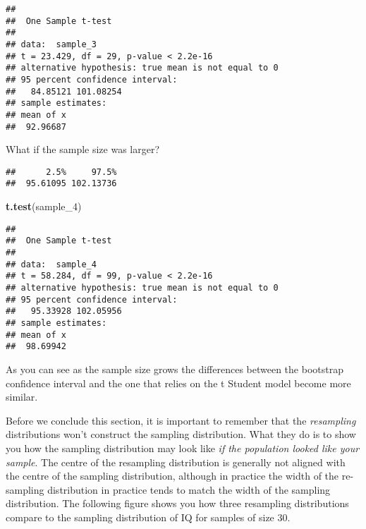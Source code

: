 \documentclass[
]{book}
\newenvironment{Shaded}{\begin{snugshade}}{\end{snugshade}}
\newcommand{\AttributeTok}[1]{\textcolor[rgb]{0.13,0.29,0.53}{#1}}
\newcommand{\DecValTok}[1]{\textcolor[rgb]{0.00,0.00,0.81}{#1}}
\newcommand{\FunctionTok}[1]{\textcolor[rgb]{0.13,0.29,0.53}{\textbf{#1}}}
\newcommand{\NormalTok}[1]{#1}
\newcommand{\OtherTok}[1]{\textcolor[rgb]{0.56,0.35,0.01}{#1}}
\newcommand{\SpecialCharTok}[1]{\textcolor[rgb]{0.81,0.36,0.00}{\textbf{#1}}}
\begin{document}
\begin{verbatim}
## 
##  One Sample t-test
## 
## data:  sample_3
## t = 23.429, df = 29, p-value < 2.2e-16
## alternative hypothesis: true mean is not equal to 0
## 95 percent confidence interval:
##   84.85121 101.08254
## sample estimates:
## mean of x 
##  92.96687
\end{verbatim}

What if the sample size was larger?

\begin{Shaded}
\end{Shaded}

\begin{verbatim}
##      2.5%     97.5% 
##  95.61095 102.13736
\end{verbatim}

\begin{Shaded}
\begin{Highlighting}[]
\FunctionTok{t.test}\NormalTok{(sample\_4)}
\end{Highlighting}
\end{Shaded}

\begin{verbatim}
## 
##  One Sample t-test
## 
## data:  sample_4
## t = 58.284, df = 99, p-value < 2.2e-16
## alternative hypothesis: true mean is not equal to 0
## 95 percent confidence interval:
##   95.33928 102.05956
## sample estimates:
## mean of x 
##  98.69942
\end{verbatim}

As you can see as the sample size grows the differences between the bootstrap confidence interval and the one that relies on the t Student model become more similar.

Before we conclude this section, it is important to remember that the \emph{resampling} distributions won't construct the sampling distribution. What they do is to show you how the sampling distribution may look like \emph{if the population looked like your sample}. The centre of the resampling distribution is generally not aligned with the centre of the sampling distribution, although in practice the width of the re-sampling distribution in practice tends to match the width of the sampling distribution. The following figure shows you how three resampling distributions compare to the sampling distribution of IQ for samples of size 30.
\end{document}
